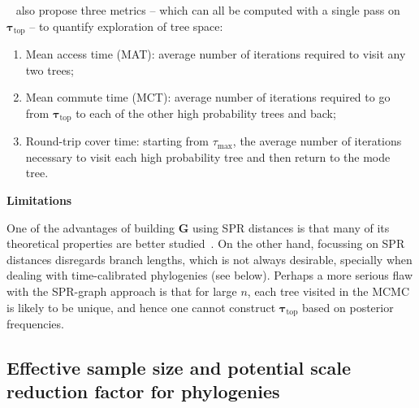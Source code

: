 ~\cite{Whidden2015} also propose three metrics -- which can all be computed with a single pass on $\boldsymbol\tau_{\text{top}}$ -- to quantify exploration of tree space:
\begin{enumerate}
 \item Mean access time (MAT): average number of iterations required to visit any two trees;
 \item Mean commute time (MCT): average number of iterations required to go from $\boldsymbol \tau_{\text{top}}$ to each of the other high probability trees and back;
 \item Round-trip cover time: starting from $\tau_{\text{max}}$, the average number of iterations necessary to visit each high probability tree and then return to the mode tree. 
\end{enumerate}

\textbf{Limitations}

One of the advantages of building $\boldsymbol G$ using SPR distances is that many of its theoretical properties are better studied~\citep{Whidden2017}.
On the other hand, focussing on SPR distances disregards branch lengths, which is not always desirable, specially when dealing with time-calibrated phylogenies (see below).
Perhaps a more serious flaw with the SPR-graph approach is that for large $n$,  each tree visited in the MCMC is likely to be unique, and hence one cannot construct $\boldsymbol \tau_{\text{top}}$ based on posterior frequencies.

\subsection{Effective sample size and potential scale reduction factor for phylogenies}
\label{sec:treeESS}

